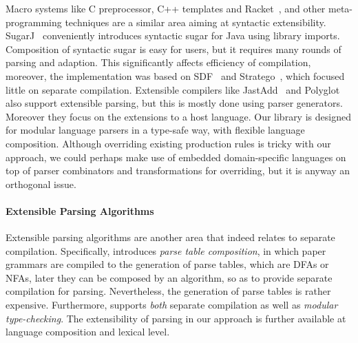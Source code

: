 Macro systems like C preprocessor, C++ templates and
Racket~\cite{Tobin-Hochstadt2011}, and other meta-programming
techniques are a similar area aiming at syntactic extensibility. 
SugarJ~\cite{Erdweg2011} conveniently introduces syntactic sugar
for Java using library imports. Composition of syntactic
sugar is easy for users, but it requires many rounds of parsing
and adaption. This significantly affects efficiency of compilation,
moreover, the implementation was based on SDF~\cite{Heering1989} and
Stratego~\cite{Visser2001}, which focused little on separate
compilation. 
Extensible compilers like JastAdd~\cite{Ekman2007} and
Polyglot~\cite{Nystrom2003} also support extensible parsing, but this
is mostly done using parser generators. Moreover 
they focus on the extensions to a host language. Our library
is designed for modular language parsers in a type-safe way, with
flexible language composition. Although overriding existing production
rules is tricky with our approach, we could perhaps make use of
embedded domain-specific languages on top of parser combinators and
transformations for overriding, but it is anyway an orthogonal issue.
  
  

\paragraph{Extensible Parsing Algorithms}
Extensible parsing algorithms are another area that indeed relates to
separate compilation. Specifically, \cite{Bravenboer2009} introduces
\textit{parse table composition}, in which paper grammars are compiled
to the generation of parse tables, which are DFAs or NFAs, later they
can be composed by an algorithm, so as to provide separate compilation
for parsing. Nevertheless, the generation of parse tables is rather
expensive. 
Furthermore, \name supports \emph{both} separate compilation
as well as \emph{modular type-checking}. The extensibility of
parsing in our approach is further available at language composition
and lexical level. 

